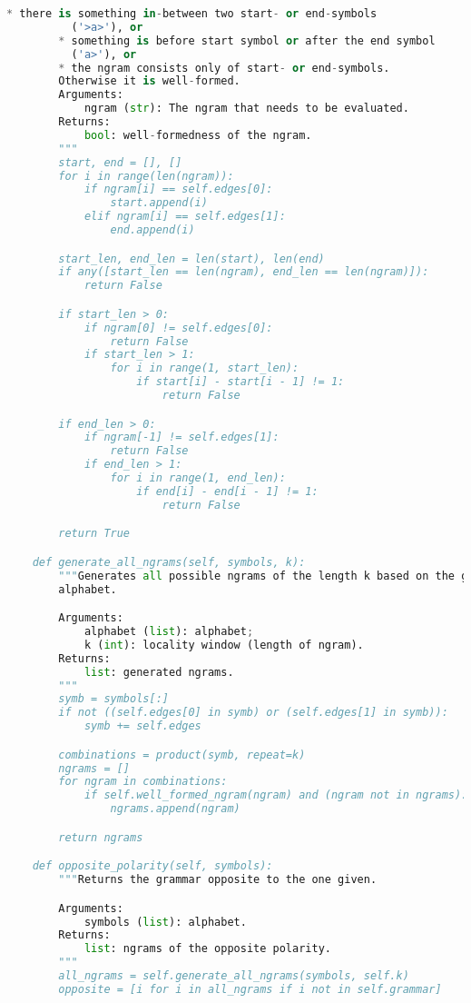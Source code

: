 \begin{lstlisting}[language=Python]
        * there is something in-between two start- or end-symbols
          ('>a>'), or
        * something is before start symbol or after the end symbol
          ('a>'), or
        * the ngram consists only of start- or end-symbols.
        Otherwise it is well-formed.
        Arguments:
            ngram (str): The ngram that needs to be evaluated.
        Returns:
            bool: well-formedness of the ngram.
        """
        start, end = [], []
        for i in range(len(ngram)):
            if ngram[i] == self.edges[0]:
                start.append(i)
            elif ngram[i] == self.edges[1]:
                end.append(i)

        start_len, end_len = len(start), len(end)
        if any([start_len == len(ngram), end_len == len(ngram)]):
            return False

        if start_len > 0:
            if ngram[0] != self.edges[0]:
                return False
            if start_len > 1:
                for i in range(1, start_len):
                    if start[i] - start[i - 1] != 1:
                        return False

        if end_len > 0:
            if ngram[-1] != self.edges[1]:
                return False
            if end_len > 1:
                for i in range(1, end_len):
                    if end[i] - end[i - 1] != 1:
                        return False

        return True

    def generate_all_ngrams(self, symbols, k):
        """Generates all possible ngrams of the length k based on the given
        alphabet.

        Arguments:
            alphabet (list): alphabet;
            k (int): locality window (length of ngram).
        Returns:
            list: generated ngrams.
        """
        symb = symbols[:]
        if not ((self.edges[0] in symb) or (self.edges[1] in symb)):
            symb += self.edges

        combinations = product(symb, repeat=k)
        ngrams = []
        for ngram in combinations:
            if self.well_formed_ngram(ngram) and (ngram not in ngrams):
                ngrams.append(ngram)

        return ngrams

    def opposite_polarity(self, symbols):
        """Returns the grammar opposite to the one given.

        Arguments:
            symbols (list): alphabet.
        Returns:
            list: ngrams of the opposite polarity.
        """
        all_ngrams = self.generate_all_ngrams(symbols, self.k)
        opposite = [i for i in all_ngrams if i not in self.grammar]


\end{lstlisting}
